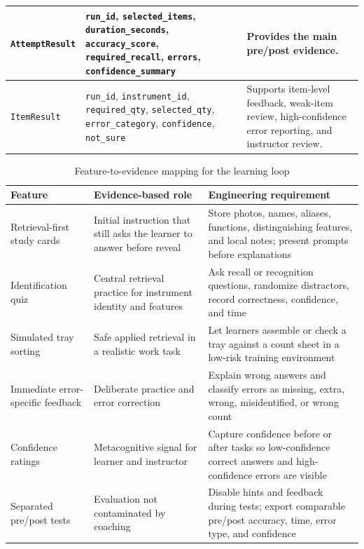 \documentclass[10pt,a4paper]{article}
\begin{document}
\begin{table}[H]
\begin{tabularx}{\textwidth}{|>{\raggedright\arraybackslash}X|>{\raggedright\arraybackslash}X|>{\raggedright\arraybackslash}X|}
\hline
\texttt{AttemptResult} & \texttt{run\_id}, \texttt{selected\_items}, \texttt{duration\_seconds}, \texttt{accuracy\_score}, \texttt{required\_recall}, \texttt{errors}, \texttt{confidence\_summary} & Provides the main pre/post evidence. \\
\hline
\texttt{ItemResult} & \texttt{run\_id}, \texttt{instrument\_id}, \texttt{required\_qty}, \texttt{selected\_qty}, \texttt{error\_category}, \texttt{confidence}, \texttt{not\_sure} & Supports item-level feedback, weak-item review, high-confidence error reporting, and instructor review. \\
\hline
\end{tabularx}
\end{table}

\begin{table}[H]
\centering
\caption{Feature-to-evidence mapping for the learning loop}
\label{tab:app-feature-to-evidence}
\small\renewcommand{\arraystretch}{1.2}\setlength{\tabcolsep}{4pt}
\begin{tabularx}{\textwidth}{|>{\raggedright\arraybackslash}X|>{\raggedright\arraybackslash}X|>{\raggedright\arraybackslash}X|}
\hline
Feature & Evidence-based role & Engineering requirement \\
\hline
Retrieval-first study cards & Initial instruction that still asks the learner to answer before reveal & Store photos, names, aliases, functions, distinguishing features, and local notes; present prompts before explanations \\
\hline
Identification quiz & Central retrieval practice for instrument identity and features & Ask recall or recognition questions, randomize distractors, record correctness, confidence, and time \\
\hline
Simulated tray sorting & Safe applied retrieval in a realistic work task & Let learners assemble or check a tray against a count sheet in a low-risk training environment \\
\hline
Immediate error-specific feedback & Deliberate practice and error correction & Explain wrong answers and classify errors as missing, extra, wrong, misidentified, or wrong count \\
\hline
Confidence ratings & Metacognitive signal for learner and instructor & Capture confidence before or after tasks so low-confidence correct answers and high-confidence errors are visible \\
\hline
Separated pre/post tests & Evaluation not contaminated by coaching & Disable hints and feedback during tests; export comparable pre/post accuracy, time, error type, and confidence \\
\hline
\end{tabularx}
\end{table}
\end{document}
